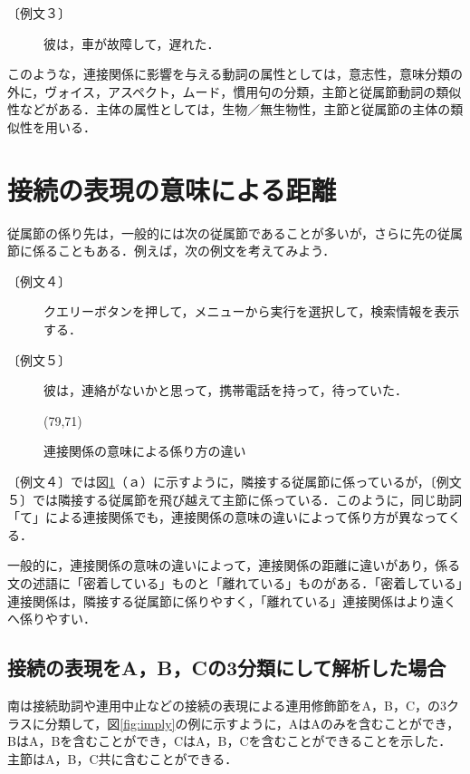\begin{description}
\item[〔例文３〕] 彼は，車が故障して，遅れた．
\end{description}

このような，連接関係に影響を与える動詞の属性としては，意志性，意味分類の外に，ヴォイス，アスペクト，ムード，慣用句の分類，主節と従属節動詞の類似性などがある．主体の属性としては，生物／無生物性，主節と従属節の主体の類似性を用いる．



\section{接続の表現の意味による距離}
\label{ch:meanings}

従属節の係り先は，一般的には次の従属節であることが多いが，さらに先の従属節に係ることもある．例えば，次の例文を考えてみよう．

\begin{description}
\item[〔例文４〕] クエリーボタンを押して，メニューから実行を選択して，検索情報を表示する．
\item[〔例文５〕] 彼は，連絡がないかと思って，携帯電話を持って，待っていた．
\end{description}

\begin{figure}
\hspace*{25mm}
\vspace*{-3mm}
\atari(79,71)
\vspace{-3mm}
\caption{連接関係の意味による係り方の違い}
\label{fig:excohere}
\end{figure}

〔例文４〕では図\ref{fig:excohere}（ａ）に示すように，隣接する従属節に係っているが，〔例文５〕では隣接する従属節を飛び越えて主節に係っている．このように，同じ助詞「て」による連接関係でも，連接関係の意味の違いによって係り方が異なってくる．

一般的に，連接関係の意味の違いによって，連接関係の距離に違いがあり，係る文の述語に「密着している」ものと「離れている」ものがある．「密着している」連接関係は，隣接する従属節に係りやすく，「離れている」連接関係はより遠くへ係りやすい．

\subsection{接続の表現をA，B，Cの3分類にして解析した場合}
南\cite{minami1993}は接続助詞や連用中止などの接続の表現による連用修飾節をA，B，C，の3クラスに分類して，図\ref{fig:imply}の例に示すように，AはAのみを含むことができ，BはA，Bを含むことができ，CはA，B，Cを含むことができることを示した．主節はA，B，C共に含むことができる．

